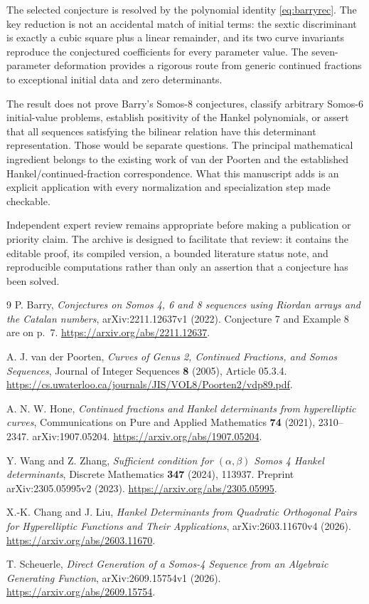 \documentclass[11pt,a4paper]{article}
\numberwithin{equation}{section}
\theoremstyle{definition}
\begin{document}
The selected conjecture is resolved by the polynomial identity
\eqref{eq:barryrec}. The key reduction is not an accidental match of initial
terms: the sextic discriminant is exactly a cubic square plus a linear
remainder, and its two curve invariants reproduce the conjectured
coefficients for every parameter value. The seven-parameter deformation
provides a rigorous route from generic continued fractions to exceptional
initial data and zero determinants.

The result does not prove Barry's Somos-8 conjectures, classify arbitrary
Somos-6 initial-value problems, establish positivity of the Hankel
polynomials, or assert that all sequences satisfying the bilinear relation
have this determinant representation. Those would be separate questions.
The principal mathematical ingredient belongs to the existing work of
van der Poorten and the established Hankel/continued-fraction correspondence.
What this manuscript adds is an explicit application with every normalization
and specialization step made checkable.

Independent expert review remains appropriate before making a publication
or priority claim. The archive is designed to facilitate that review: it
contains the editable proof, its compiled version, a bounded literature
status note, and reproducible computations rather than only an assertion
that a conjecture has been solved.

\clearpage
\begin{thebibliography}{9}
P. Barry, \emph{Conjectures on Somos 4, 6 and 8 sequences using Riordan arrays
and the Catalan numbers}, arXiv:2211.12637v1 (2022).
Conjecture 7 and Example 8 are on p.~7.
\url{https://arxiv.org/abs/2211.12637}.

A. J. van der Poorten, \emph{Curves of Genus 2, Continued Fractions, and
Somos Sequences}, Journal of Integer Sequences \textbf{8} (2005), Article 05.3.4.
\url{https://cs.uwaterloo.ca/journals/JIS/VOL8/Poorten2/vdp89.pdf}.

A. N. W. Hone, \emph{Continued fractions and Hankel determinants from
hyperelliptic curves}, Communications on Pure and Applied Mathematics
\textbf{74} (2021), 2310--2347. arXiv:1907.05204.
\url{https://arxiv.org/abs/1907.05204}.

Y. Wang and Z. Zhang, \emph{Sufficient condition for $(\alpha,\beta)$ Somos 4
Hankel determinants}, Discrete Mathematics \textbf{347} (2024), 113937.
Preprint arXiv:2305.05995v2 (2023).
\url{https://arxiv.org/abs/2305.05995}.

X.-K. Chang and J. Liu, \emph{Hankel Determinants from Quadratic Orthogonal
Pairs for Hyperelliptic Functions and Their Applications},
arXiv:2603.11670v4 (2026).
\url{https://arxiv.org/abs/2603.11670}.

T. Scheuerle, \emph{Direct Generation of a Somos-4 Sequence from an Algebraic
Generating Function}, arXiv:2609.15754v1 (2026).
\url{https://arxiv.org/abs/2609.15754}.
\end{thebibliography}
\end{document}
